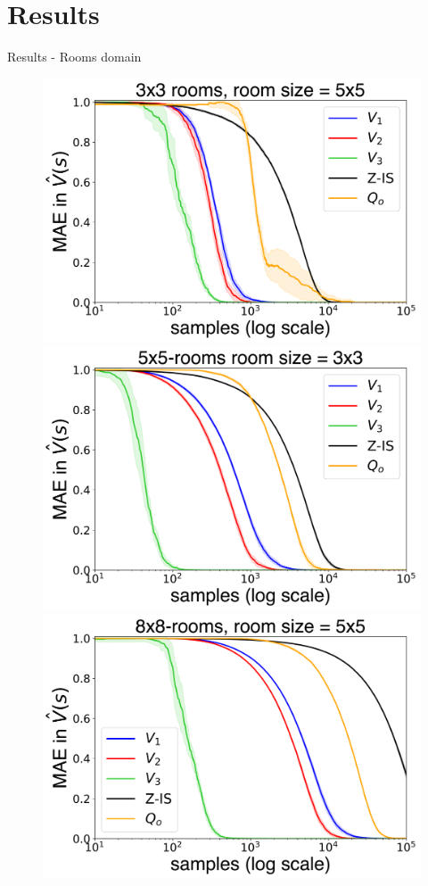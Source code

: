 \documentclass{beamer}
\theoremstyle{mystyle}
\begin{document}
\section{Results}
\begin{frame}{Results - Rooms domain}

\begin{figure}[H]
\centering
\includegraphics[scale=0.2]{Figures/nroom_3_3-1.png}
\includegraphics[scale=0.2]{Figures/nroom_5_5-1.png}
\includegraphics[scale=0.2]{Figures/nroom_8_8-1.png}


\end{figure}
\end{frame}
\end{document}
